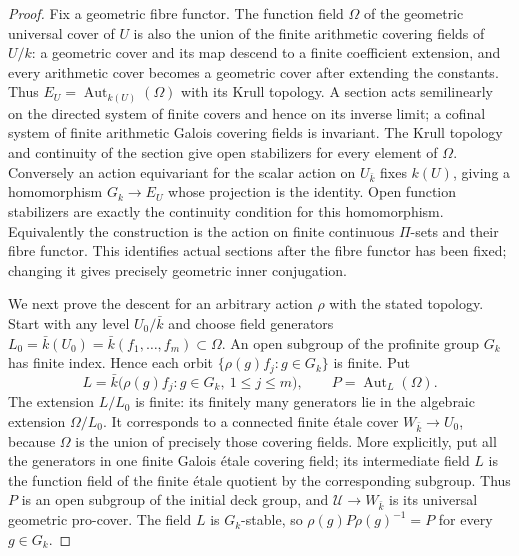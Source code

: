 \begin{proof}
Fix a geometric fibre functor. The function field $\Omega$ of
the geometric universal cover of $U$ is also the union of the
finite arithmetic covering fields of $U/k$: a geometric cover
and its map descend to a finite coefficient extension, and every
arithmetic cover becomes a geometric cover after extending the
constants. Thus
$E_U=\operatorname{Aut}_{k(U)}(\Omega)$ with its Krull topology.
A section acts semilinearly on the directed system of finite
covers and hence on its inverse limit; a cofinal system of
finite arithmetic Galois covering fields is invariant.
The Krull topology and continuity of the section give open
stabilizers for every element of $\Omega$. Conversely an
action equivariant for the scalar action on $U_{\bar k}$ fixes
$k(U)$, giving a homomorphism $G_k\to E_U$ whose projection
is the identity. Open function stabilizers are exactly the
continuity condition for this homomorphism. Equivalently the
construction is the action on finite continuous $\Pi$-sets
and their fibre functor. This identifies actual sections after
the fibre functor has been fixed; changing it gives precisely
geometric inner conjugation.

We next prove the descent for an arbitrary action $\rho$ with
the stated topology. Start with any level $U_0/\bar k$ and
choose field generators
$L_0=\bar k(U_0)=\bar k(f_1,\ldots,f_m)\subset\Omega$.
An open subgroup of the profinite group $G_k$ has finite index.
Hence each orbit $\{\rho(g)f_j:g\in G_k\}$ is finite. Put
\[
 L=\bar k\bigl(\rho(g)f_j:
                   g\in G_k,\ 1\le j\le m\bigr),\qquad
 P=\operatorname{Aut}_L(\Omega).                         \tag{ZCF.4}
\]
The extension $L/L_0$ is finite: its finitely many generators
lie in the algebraic extension $\Omega/L_0$. It corresponds
to a connected finite \'etale cover $W_{\bar k}\to U_0$,
because $\Omega$ is the union of precisely those covering
fields. More explicitly, put all the generators in one finite
Galois \'etale covering field; its intermediate field $L$ is
the function field of the finite \'etale quotient by the
corresponding subgroup. Thus $P$ is an open subgroup of the
initial deck group, and $\mathcal U\to W_{\bar k}$ is its
universal geometric pro-cover. The field $L$ is $G_k$-stable,
so $\rho(g)P\rho(g)^{-1}=P$ for every $g\in G_k$.


\end{proof}
